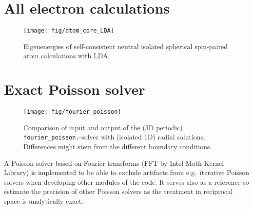 \documentclass[oribibl]{llncs}
\newcommand{\ttt}[1]{\texttt{#1}}
\begin{document}
\section{All electron calculations}\label{sec:all-electron}
%
\begin{figure}
  \begin{minipage}[c]{.990\textwidth}
	\texttt{[image: fig/atom\_core\_LDA]} %
  \end{minipage}\hfill
  \begin{minipage}[c]{.009\textwidth}
  \end{minipage}
  \label{fig:atom_core_levels}
  \caption{
	Eigenenergies of self-consistent neutral isolated spherical spin-paired atom calculations with LDA.
  }
\end{figure}
%
%

\section{Exact Poisson solver}
%
\begin{figure}
  \begin{minipage}[c]{.990\textwidth}
	\texttt{[image: fig/fourier\_poisson]} %
  \end{minipage}\hfill
  \begin{minipage}[c]{.009\textwidth}
  \end{minipage}
  \label{fig:fourier_poisson_solver}
  \caption{
	Comparison of input and output of the (3D periodic) \ttt{fourier\_poisson.}-solver with (isolated 1D) radial solutions.
	Differences might stem from the different boundary conditions.
  }
\end{figure}
%
%
A Poisson solver based on Fourier-transforms (FFT by Intel Math Kernel Library)
is implemented to be able to exclude artifacts from e.g.~iterative Poisson solvers
when developing other modules of the code. 
It serves also as a reference so estimate the precision of other Poisson solvers
as the treatment in reciprocal space is analytically exact.
\end{document}
